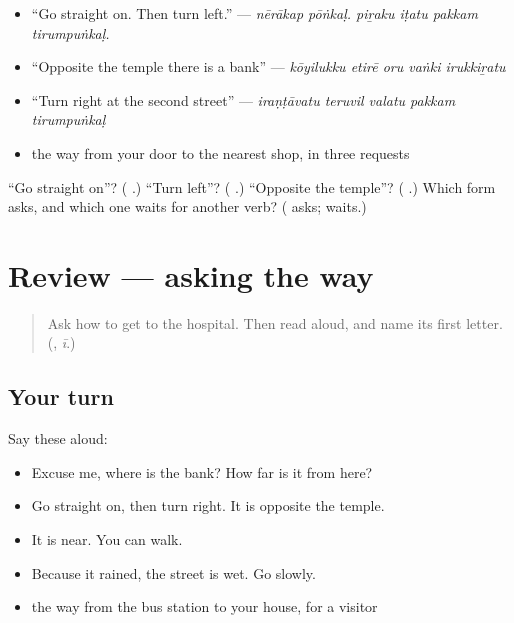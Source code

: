 \begin{itemize}
\raggedright
  \item \textquotedblleft{}Go straight on. Then turn left.\textquotedblright{} — \emph{nērākap pōṅkaḷ. piṟaku iṭatu pakkam tirumpuṅkaḷ.}
  \item \textquotedblleft{}Opposite the temple there is a bank\textquotedblright{} — \emph{kōyilukku etirē oru vaṅki irukkiṟatu}
  \item \textquotedblleft{}Turn right at the second street\textquotedblright{} — \emph{iraṇṭāvatu teruvil valatu pakkam tirumpuṅkaḷ}
  \item the way from your door to the nearest shop, in three requests
\end{itemize}

\begin{tcolorbox}[breakable,colback=teal!4,colframe=teal!35!black,title={Before you move on}]
\textquotedblleft{}Go straight on\textquotedblright{}? (\textbf{ }.) \textquotedblleft{}Turn left\textquotedblright{}? (\textbf{  }.) \textquotedblleft{}Opposite the temple\textquotedblright{}? (\textbf{ }.) Which form asks, and which one waits for another verb? (\textbf{} asks; \textbf{} waits.)
\end{tcolorbox}
\section[(review)]{Review — asking the way}

\label{lesson:TA-R288-asking-the-way}



\begin{quote}
Ask how to get to the hospital. Then read \textbf{} aloud, and name its first letter. (\textbf{}, \emph{ī}.)
\end{quote}

\subsection*{Your turn}
Say these aloud:

\begin{itemize}
\raggedright
  \item Excuse me, where is the bank? How far is it from here?
  \item Go straight on, then turn right. It is opposite the temple.
  \item It is near. You can walk.
  \item Because it rained, the street is wet. Go slowly.
  \item the way from the bus station to your house, for a visitor
\end{itemize}


